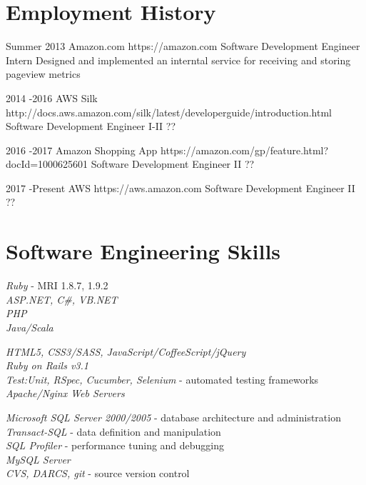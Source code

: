 

\section{Employment History}

\job
{Summer 2013}{}
{Amazon.com}
{https://amazon.com}
{Software Development Engineer Intern}
{Designed and implemented an interntal service for receiving and storing pageview metrics}

\job
{2014 -}{2016}
{AWS Silk}
{http://docs.aws.amazon.com/silk/latest/developerguide/introduction.html}
{Software Development Engineer I-II}
{??}

\job
{2016 -}{2017}
{Amazon Shopping App}
{https://amazon.com/gp/feature.html?docId=1000625601}
{Software Development Engineer II}
{??}

\job
{2017 -}{Present}
{AWS}
{https://aws.amazon.com}
{Software Development Engineer II}
{??}


\section{Software Engineering Skills}

{
\textit{Ruby} - MRI 1.8.7, 1.9.2\\
\textit{ASP.NET, C\#, VB.NET}\\
\textit{PHP}\\
\textit{Java/Scala}
}


{
\textit{HTML5, CSS3/SASS, JavaScript/CoffeeScript/jQuery}\\
\textit{Ruby on Rails v3.1}\\
\textit{Test:Unit, RSpec, Cucumber, Selenium} - automated testing frameworks\\
\textit{Apache/Nginx Web Servers}
}


{
\textit{Microsoft SQL Server 2000/2005} - database architecture and administration\\
\textit{Transact-SQL} - data definition and manipulation\\
\textit{SQL Profiler} - performance tuning and debugging\\
\textit{MySQL Server}\\
\textit{CVS, DARCS, git} - source version control
}

